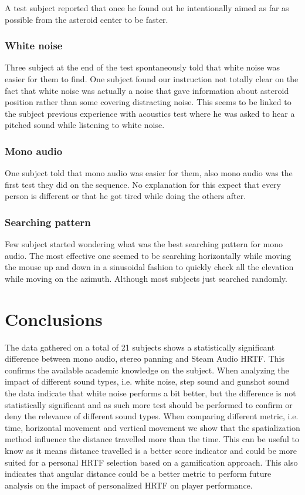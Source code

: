\documentclass[conference]{IEEEtran}
\begin{document}
A test subject reported that once he found out he intentionally aimed as far as possible from the asteroid center to be faster.\\

\subsubsection{White noise}
Three subject at the end of the test spontaneously told that white noise was easier for them to find.
One subject found our instruction not totally clear on the fact that white noise was actually a noise that gave information about asteroid position rather than some covering distracting noise. This seems to be linked to the subject previous experience with acoustics test where he was asked to hear a pitched sound while listening to white noise.\\

\subsubsection{Mono audio}
One subject told that mono audio was easier for them, also mono audio was the first test they did on the sequence. No explanation for this expect that every person is different or that he got tired while doing the others after.\\

\subsubsection{Searching pattern}
Few subject started wondering what was the best searching pattern for mono audio. The most effective one seemed to be searching horizontally while moving the mouse up and down in a sinusoidal fashion to quickly check all the elevation while moving on the azimuth. Although most subjects just searched randomly.

\section{Conclusions}
The data gathered on a total of 21 subjects shows a statistically significant difference between mono audio, stereo panning and Steam Audio HRTF. This confirms the available academic knowledge on the subject.
When analyzing the impact of different sound types, i.e. white noise, step sound and gunshot sound the data indicate that white noise performs a bit better, but the difference is not statistically significant and as such more test should be performed to confirm or deny the relevance of different sound types.
When comparing different metric, i.e. time, horizontal movement and vertical movement we show that the spatialization method influence the distance travelled more than the time. This can be useful to know as it means distance travelled is a better score indicator and could be more suited for a personal HRTF selection based on a gamification approach.
This also indicates that angular distance could be a better metric to perform future analysis on the impact of personalized HRTF on player performance.
\end{document}
